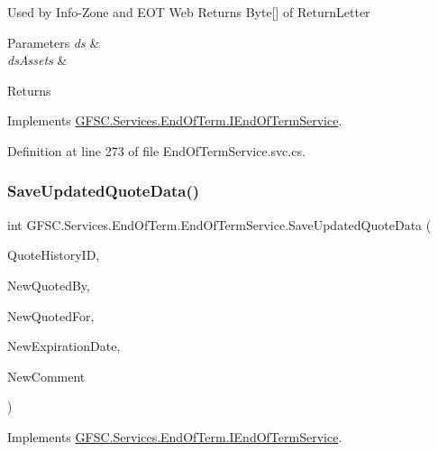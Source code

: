 Used by Info-\/\+Zone and E\+OT Web Returns Byte\mbox{[}\mbox{]} of Return\+Letter 


\begin{DoxyParams}{Parameters}
{\em ds} & \\
\hline
{\em ds\+Assets} & \\
\hline
\end{DoxyParams}
\begin{DoxyReturn}{Returns}

\end{DoxyReturn}


Implements \mbox{\hyperlink{interface_g_f_s_c_1_1_services_1_1_end_of_term_1_1_i_end_of_term_service_a5f9aaee8a7a76fc2575dd6806348074c}{G\+F\+S\+C.\+Services.\+End\+Of\+Term.\+I\+End\+Of\+Term\+Service}}.



Definition at line 273 of file End\+Of\+Term\+Service.\+svc.\+cs.

\mbox{\label{class_g_f_s_c_1_1_services_1_1_end_of_term_1_1_end_of_term_service_ae32d61b9602017ad2246831d6c060a87}} 
\subsubsection{\texorpdfstring{Save\+Updated\+Quote\+Data()}{SaveUpdatedQuoteData()}}
{\footnotesize\ttfamily int G\+F\+S\+C.\+Services.\+End\+Of\+Term.\+End\+Of\+Term\+Service.\+Save\+Updated\+Quote\+Data (\begin{DoxyParamCaption}\item[{int}]{Quote\+History\+ID,  }\item[{string}]{New\+Quoted\+By,  }\item[{string}]{New\+Quoted\+For,  }\item[{Date\+Time}]{New\+Expiration\+Date,  }\item[{string}]{New\+Comment }\end{DoxyParamCaption})}



Implements \mbox{\hyperlink{interface_g_f_s_c_1_1_services_1_1_end_of_term_1_1_i_end_of_term_service_aa737f02391b7bf664bbd6f0e21f57a64}{G\+F\+S\+C.\+Services.\+End\+Of\+Term.\+I\+End\+Of\+Term\+Service}}.



